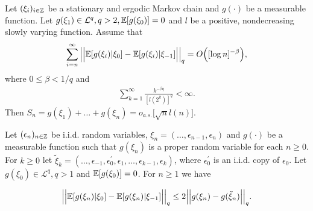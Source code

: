 \begin{theoremA}{\cite{Wu2007}}\label{theo-wu-2}
Let $(\xi_i)_{i \in \mathbb{Z}}$ be a stationary and ergodic Markov chain and $g(\cdot)$ be a measurable function. Let $g(\xi_1) \in \mathcal{L}^q, q > 2, \mathbb{E}[g(\xi_0)] = 0$ and $\mathit{l}$ be a positive, nondecreasing slowly varying function. Assume that $$ \sum_{i = n}^\infty \Big|\Big| \mathbb{E} [g(\xi_i)| \xi_0] - \mathbb{E} [g(\xi_i)| \xi_{-1}]\Big|\Big|_q =O\Big([\log n]^{-\beta}\Big),$$ where $0 \leq \beta<1/q$ and 
\begin{align*}
\sum_{k=1}^\infty \frac{k^{-\beta q}}{[l(2^k)]^q} < \infty.	
\end{align*}
Then $S_n = g(\xi_1) + \ldots + g(\xi_n) = o_{a.s.}\big[\sqrt{n}l(n)\big]$.
\end{theoremA}

\begin{propA}{\cite{Wu2007}}\label{prop-wu}
Let $(\epsilon_n)_{n\in\mathbb{Z}}$ be i.i.d. random variables, $\xi_n = (\ldots, \epsilon_{n-1}, \epsilon_n)$ and $g(\cdot)$ be a measurable function such that $g(\xi_n)$ is a proper random variable for each $n \geq 0$. For $k \geq 0$ let $\tilde{\xi}_k = (\ldots, \epsilon_{-1}, \epsilon_0^\prime, \epsilon_1, \ldots, \epsilon_{k-1}, \epsilon_k)$, where $\epsilon_0^\prime$ is an i.i.d. copy of $\epsilon_0$. Let $g(\xi_0) \in \mathcal{L}^q, q > 1$ and $\mathbb{E}[g(\xi_0)] = 0$. For $n \geq 1$ we have

$$\Big|\Big| \mathbb{E} [g(\xi_n)| \xi_0] - \mathbb{E} [g(\xi_n)| \xi_{-1}]\Big|\Big|_q \leq 2 \Big|\Big| g(\xi_n) - g(\tilde{\xi}_n)\Big|\Big|_q.$$
\end{propA}

